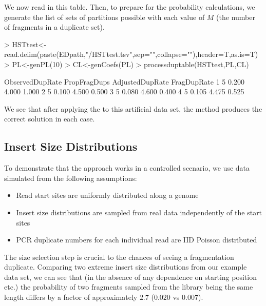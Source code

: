 \documentclass{article}
\begin{document}
We now read in this table. Then, to prepare for the probability calculations, we  generate the list of sets of partitions possible with each value of $M$ (the number of fragments in a duplicate set). 

\begin{Schunk}
\begin{Sinput}
> HSTtest<-read.delim(paste(EDpath,"/HSTtest.tsv",sep="",collapse=""),header=T,as.is=T)
> PL<-genPL(10)
> CL<-genCoefs(PL)
> processduptable(HSTtest,PL,CL)
\end{Sinput}
\begin{Soutput}
  ObservedDupRate PropFragDups AdjustedDupRate FragDupRate
1               5        0.200           4.000       1.000
2               5        0.100           4.500       0.500
3               5        0.080           4.600       0.400
4               5        0.105           4.475       0.525
\end{Soutput}
\end{Schunk}

We see that after applying the  to this artificial data set, the method produces the correct solution in each case.


\subsection{Insert Size Distributions}
To demonstrate that the approach works in a controlled scenario, we use data simulated from the following assumptions: 

\begin{itemize}
\item Read start sites are uniformly distributed along a genome
\item Insert size distributions are sampled from real data independently of the start sites
\item PCR duplicate numbers for each individual read are IID Poisson distributed
\end{itemize}

The size selection step is crucial to the chances of seeing a fragmentation duplicate. Comparing two extreme insert size distributions from our example data set, we can see that (in the absence of any dependence on starting position etc.) the probability of two fragments sampled from the library being the same length differs by a factor of approximately $2.7$ ($0.020$ vs $0.007$).
\end{document}

